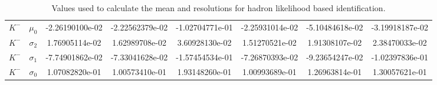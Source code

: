 \begin{landscape}
\begin{table}
\begin{tabular}{c|c|c|c|c|c|c|c}
       $K^-$ & $\mu_0$ & -2.26190100e-02 &    -2.22562379e-02 &     -1.02704771e-01 &    -2.25931014e-02 &    -5.10484618e-02 &    -3.19918187e-02 \\
    $K^-$ & $\sigma_2$ & 1.76905114e-02 &     1.62989708e-02 &     3.60928130e-02 &     1.51270521e-02 &     1.91308107e-02 &     2.38470033e-02 \\
    $K^-$ & $\sigma_1$ & -7.74901862e-02 &    -7.33041628e-02 &    -1.57454534e-01 &    -7.26870393e-02 &     -9.23654247e-02 &    -1.02397836e-01 \\
    $K^-$ & $\sigma_0$ & 1.07082820e-01 &     1.00573410e-01 &     1.93148260e-01 &     1.00993689e-01 &     1.26963814e-01 &     1.30057621e-01
  \end{tabular}
  \caption{Values used to calculate the mean and resolutions for hadron likelihood based identification.}
  \label{table-hadron-pdfs}
  \end{table}
\end{landscape}




